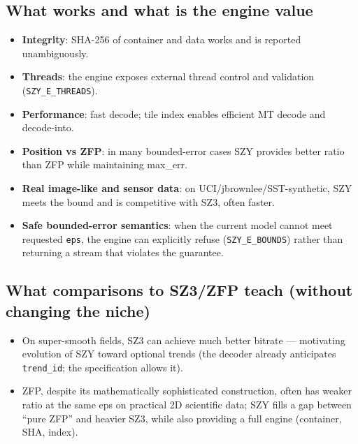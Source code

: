 \documentclass[11pt,a4paper]{article}
\begin{document}
\subsection{What works and what is the engine value}
\begin{itemize}
  \item \textbf{Integrity}: SHA-256 of container and data works and is reported unambiguously.
  \item \textbf{Threads}: the engine exposes external thread control and validation (\texttt{SZY\_E\_THREADS}).
  \item \textbf{Performance}: fast decode; tile index enables efficient MT decode and decode-into.
  \item \textbf{Position vs ZFP}: in many bounded-error cases SZY provides better ratio than ZFP while maintaining max\_err.
  \item \textbf{Real image-like and sensor data}: on UCI/jbrownlee/SST-synthetic, SZY meets the bound and is competitive with SZ3, often faster.
  \item \textbf{Safe bounded-error semantics}: when the current model cannot meet requested \texttt{eps}, the engine can explicitly refuse (\texttt{SZY\_E\_BOUNDS}) rather than returning a stream that violates the guarantee.
\end{itemize}

\subsection{What comparisons to SZ3/ZFP teach (without changing the niche)}
\begin{itemize}
  \item On super-smooth fields, SZ3 can achieve much better bitrate --- motivating evolution of SZY toward optional trends (the decoder already anticipates \texttt{trend\_id}; the specification allows it).
  \item ZFP, despite its mathematically sophisticated construction, often has weaker ratio at the same eps on practical 2D scientific data; SZY fills a gap between ``pure ZFP'' and heavier SZ3, while also providing a full engine (container, SHA, index).
\end{itemize}
\end{document}
